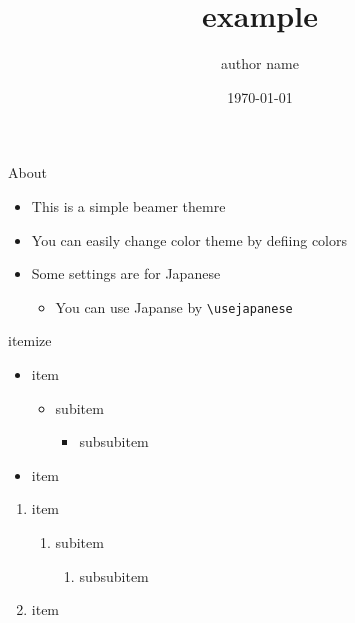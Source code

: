 \documentclass[13pt, dvipdfmx]{beamer}
\title{example}
\author{author name}
\date{\today}
\begin{document}
\maketitle

\begin{frame}[fragile]{About}
    \begin{itemize}
        \item This is a simple beamer themre
        \item You can easily change color theme by defiing colors
        \item Some settings are for Japanese
        \begin{itemize}
            \item You can use Japanse by \verb|\usejapanese|
        \end{itemize}
    \end{itemize}
\end{frame}

\begin{frame}[fragile]{itemize}
    \begin{itemize}
        \item item
            \begin{itemize}
                \item subitem
                    \begin{itemize}
                        \item subsubitem
                    \end{itemize}
            \end{itemize}
        \item item
    \end{itemize}

    \begin{enumerate}
        \item item
            \begin{enumerate}
                \item subitem
                    \begin{enumerate}
                        \item subsubitem
                    \end{enumerate}
            \end{enumerate}
        \item item
    \end{enumerate}
\end{frame}
\end{document}
